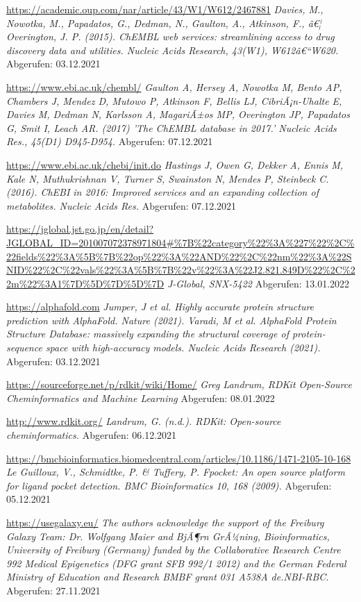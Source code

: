 \begin{thebibliography}{9}
\url{https://academic.oup.com/nar/article/43/W1/W612/2467881} \emph{Davies, M., Nowotka, M., Papadatos, G., Dedman, N., Gaulton, A., Atkinson, F., â€¦ Overington, J. P. (2015). ChEMBL web services: streamlining access to drug discovery data and utilities. Nucleic Acids Research, 43(W1), W612â€“W620.}
Abgerufen: 03.12.2021

\url{https://www.ebi.ac.uk/chembl/} \emph{Gaulton A, Hersey A, Nowotka M, Bento AP, Chambers J, Mendez D, Mutowo P, Atkinson F, Bellis LJ, CibriÃ¡n-Uhalte E, Davies M, Dedman N, Karlsson A, MagariÃ±os MP, Overington JP, Papadatos G, Smit I, Leach AR. (2017) 'The ChEMBL database in 2017.' Nucleic Acids Res., 45(D1) D945-D954.}
Abgerufen: 07.12.2021

\url{https://www.ebi.ac.uk/chebi/init.do} \emph{Hastings J, Owen G, Dekker A, Ennis M, Kale N, Muthukrishnan V, Turner S, Swainston N, Mendes P, Steinbeck C. (2016). ChEBI in 2016: Improved services and an expanding collection of metabolites. Nucleic Acids Res.}
Abgerufen: 07.12.2021

\url{https://jglobal.jst.go.jp/en/detail?JGLOBAL_ID=201007072378971804#%7B%22category%22%3A%227%22%2C%22fields%22%3A%5B%7B%22op%22%3A%22AND%22%2C%22nm%22%3A%22SNID%22%2C%22vals%22%3A%5B%7B%22v%22%3A%22J2.821.849D%22%2C%22m%22%3A1%7D%5D%7D%5D%7D} \emph{J-Global, SNX-5422}
Abgerufen: 13.01.2022

\url{https://alphafold.com} \emph{Jumper, J et al. Highly accurate protein structure prediction with AlphaFold. Nature (2021). Varadi, M et al. AlphaFold Protein Structure Database: massively expanding the structural coverage of protein-sequence space with high-accuracy models. Nucleic Acids Research (2021).}
Abgerufen: 03.12.2021

\url{https://sourceforge.net/p/rdkit/wiki/Home/} \emph{Greg Landrum, RDKit Open-Source Cheminformatics and Machine Learning}
Abgerufen: 08.01.2022

\url{http://www.rdkit.org/} \emph{Landrum, G. (n.d.). RDKit: Open-source cheminformatics.}
Abgerufen: 06.12.2021

\url{https://bmcbioinformatics.biomedcentral.com/articles/10.1186/1471-2105-10-168} \emph{Le Guilloux, V., Schmidtke, P. & Tuffery, P. Fpocket: An open source platform for ligand pocket detection. BMC Bioinformatics 10, 168 (2009).}
Abgerufen: 05.12.2021

\url{https://usegalaxy.eu/} \emph{The authors acknowledge the support of the Freiburg Galaxy Team: Dr. Wolfgang Maier and BjÃ¶rn GrÃ¼ning, Bioinformatics, University of Freiburg (Germany) funded by the Collaborative Research Centre 992 Medical Epigenetics (DFG grant SFB 992/1 2012) and the German Federal Ministry of Education and Research BMBF grant 031 A538A de.NBI-RBC.}
Abgerufen: 27.11.2021


\end{thebibliography}
